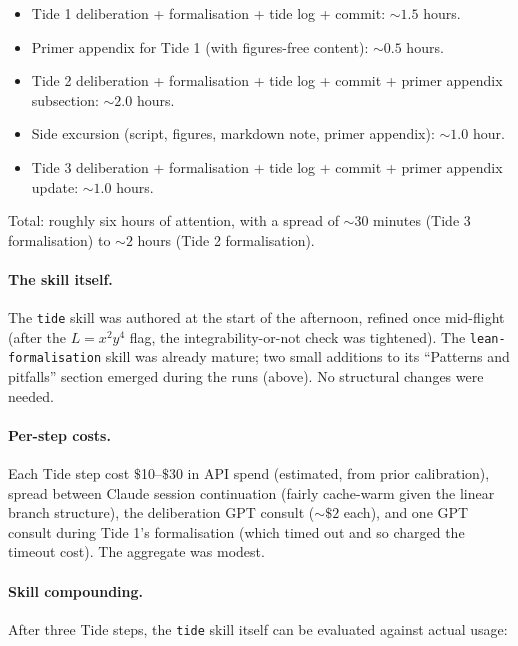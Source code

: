 \documentclass[11pt]{article}
\begin{document}
\begin{itemize}
\item Tide 1 deliberation + formalisation + tide log + commit: $\sim 1.5$ hours.
\item Primer appendix for Tide 1 (with figures-free content): $\sim 0.5$ hours.
\item Tide 2 deliberation + formalisation + tide log + commit + primer
appendix subsection: $\sim 2.0$ hours.
\item Side excursion (script, figures, markdown note, primer appendix):
$\sim 1.0$ hour.
\item Tide 3 deliberation + formalisation + tide log + commit + primer
appendix update: $\sim 1.0$ hours.
\end{itemize}

Total: roughly six hours of attention, with a spread of $\sim 30$
minutes (Tide 3 formalisation) to $\sim 2$ hours (Tide 2 formalisation).

\paragraph{The skill itself.} The \texttt{tide} skill was authored at
the start of the afternoon, refined once mid-flight (after the
$L=x^2y^4$ flag, the integrability-or-not check was tightened). The
\texttt{lean-formalisation} skill was already mature; two small
additions to its ``Patterns and pitfalls'' section emerged during the
runs (above). No structural changes were needed.

\paragraph{Per-step costs.} Each Tide step cost $\$$10--$\$$30 in API
spend (estimated, from prior calibration), spread between Claude
session continuation (fairly cache-warm given the linear branch
structure), the deliberation GPT consult ($\sim \$2$ each), and one
GPT consult during Tide 1's formalisation (which timed out and so
charged the timeout cost). The aggregate was modest.

\paragraph{Skill compounding.} After three Tide steps, the
\texttt{tide} skill itself can be evaluated against actual usage:
\end{document}
